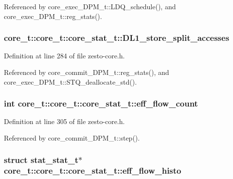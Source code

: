 Referenced by core\_\-exec\_\-DPM\_\-t::LDQ\_\-schedule(), and core\_\-exec\_\-DPM\_\-t::reg\_\-stats().
\subsubsection[{DL1\_\-store\_\-split\_\-accesses}]{ core\_\-t::core\_\-t::core\_\-stat\_\-t::DL1\_\-store\_\-split\_\-accesses}\label{structcore__t_1_1core__stat__t_e3f4766c49b7d48cff4cdcbf0db8f24a}




Definition at line 284 of file zesto-core.h.

Referenced by core\_\-commit\_\-DPM\_\-t::reg\_\-stats(), and core\_\-exec\_\-DPM\_\-t::STQ\_\-deallocate\_\-std().
\subsubsection[{eff\_\-flow\_\-count}]{\setlength{\rightskip}{0pt plus 5cm}int core\_\-t::core\_\-t::core\_\-stat\_\-t::eff\_\-flow\_\-count}\label{structcore__t_1_1core__stat__t_46957b4310b2a3cab7583bef08b2d94b}




Definition at line 305 of file zesto-core.h.

Referenced by core\_\-commit\_\-DPM\_\-t::step().
\subsubsection[{eff\_\-flow\_\-histo}]{\setlength{\rightskip}{0pt plus 5cm}struct {\bf stat\_\-stat\_\-t}$\ast$ core\_\-t::core\_\-t::core\_\-stat\_\-t::eff\_\-flow\_\-histo\hspace{0.3cm}{\tt  [read]}}\label{structcore__t_1_1core__stat__t_b6a60a80d28dae8b4d70540af78fc0ba}




